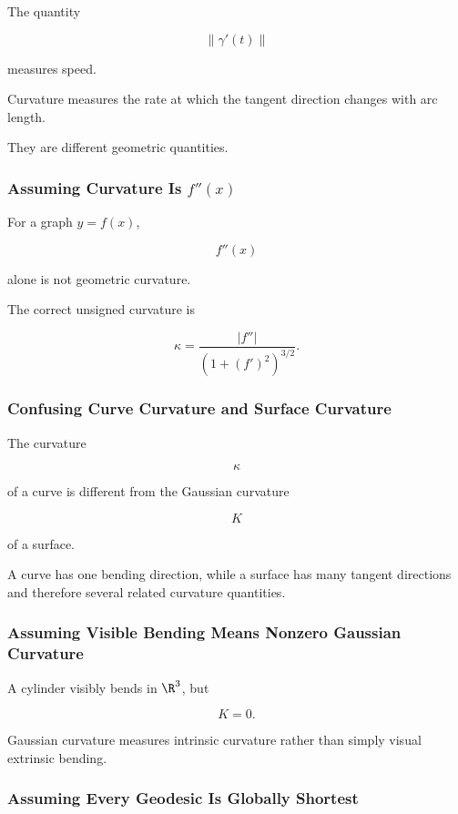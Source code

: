 The quantity

\[
\|\gamma'(t)\|
\]

measures speed.

Curvature measures the rate at which the tangent direction changes with arc
length.

They are different geometric quantities.

\subsubsection{Assuming Curvature Is \(f''(x)\)}

For a graph \(y=f(x)\),

\[
f''(x)
\]

alone is not geometric curvature.

The correct unsigned curvature is

\[
\boxed{
\kappa
=
\frac{|f''|}
{(1+(f')^2)^{3/2}}.
}
\]

\subsubsection{Confusing Curve Curvature and Surface Curvature}

The curvature

\[
\kappa
\]

of a curve is different from the Gaussian curvature

\[
K
\]

of a surface.

A curve has one bending direction, while a surface has many tangent
directions and therefore several related curvature quantities.

\subsubsection{Assuming Visible Bending Means Nonzero Gaussian Curvature}

A cylinder visibly bends in \(\R^3\), but

\[
K=0.
\]

Gaussian curvature measures intrinsic curvature rather than simply visual
extrinsic bending.

\subsubsection{Assuming Every Geodesic Is Globally Shortest}

